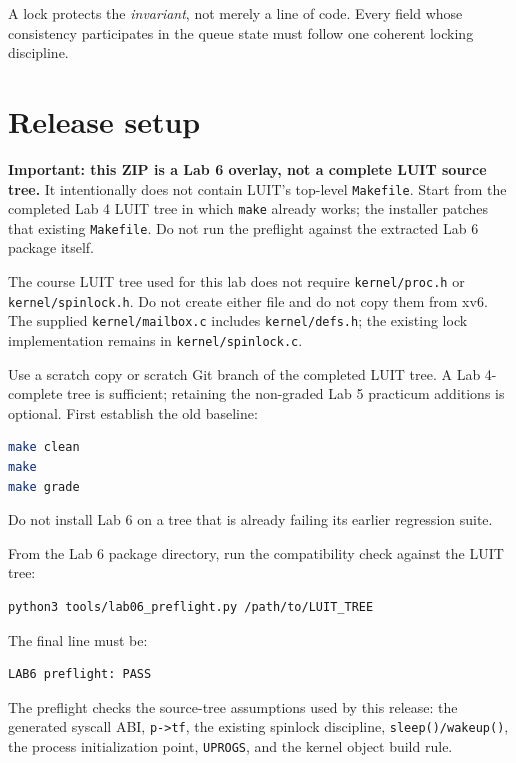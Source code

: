\documentclass[11pt,a4paper]{article}
\newcommand{\file}[1]{\texttt{#1}}
\begin{document}
A lock protects the \emph{invariant}, not merely a line of code. Every field whose consistency participates in the queue state must follow one coherent locking discipline.

\section{Release setup}

\textbf{Important: this ZIP is a Lab 6 overlay, not a complete LUIT source tree.} It intentionally does not contain LUIT's top-level \file{Makefile}. Start from the completed Lab 4 LUIT tree in which \file{make} already works; the installer patches that existing \file{Makefile}. Do not run the preflight against the extracted Lab 6 package itself.

The course LUIT tree used for this lab does not require \file{kernel/proc.h} or \file{kernel/spinlock.h}. Do not create either file and do not copy them from xv6. The supplied \file{kernel/mailbox.c} includes \file{kernel/defs.h}; the existing lock implementation remains in \file{kernel/spinlock.c}.

Use a scratch copy or scratch Git branch of the completed LUIT tree. A Lab 4-complete tree is sufficient; retaining the non-graded Lab 5 practicum additions is optional. First establish the old baseline:

\begin{lstlisting}[language=bash]
make clean
make
make grade
\end{lstlisting}

Do not install Lab 6 on a tree that is already failing its earlier regression suite.

From the Lab 6 package directory, run the compatibility check against the LUIT tree:

\begin{lstlisting}[language=bash]
python3 tools/lab06_preflight.py /path/to/LUIT_TREE
\end{lstlisting}

The final line must be:

\begin{lstlisting}
LAB6 preflight: PASS
\end{lstlisting}

The preflight checks the source-tree assumptions used by this release: the generated syscall ABI, \file{p->tf}, the existing spinlock discipline, \file{sleep()/wakeup()}, the process initialization point, \file{UPROGS}, and the kernel object build rule.
\end{document}
